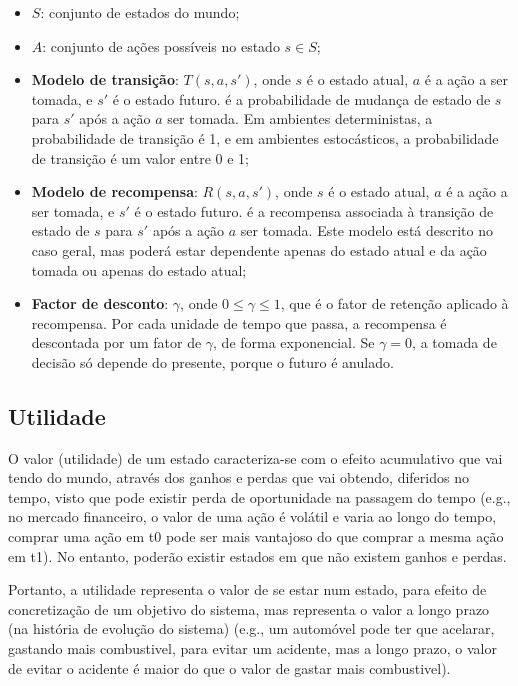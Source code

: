 \begin{itemize}\label{itemize:processo-decisao-markov}
    \item \textbf{$S$}: conjunto de estados do mundo;
    \item \textbf{$A$}: conjunto de ações possíveis no estado $s \in S$;
    \item \textbf{Modelo de transição}: \( T(s, a, s') \), onde \( s \) é o estado atual, \( a \) é a ação a ser tomada, e \( s' \) é o estado futuro.
    é a probabilidade de mudança de estado de \( s \) para \( s' \) após a ação \( a \) ser tomada.
    Em ambientes deterministas, a probabilidade de transição é 1, e em ambientes estocásticos, a probabilidade de transição é um valor entre 0 e 1;
    \item \textbf{Modelo de recompensa}: \( R(s, a, s') \), onde \( s \) é o estado atual, \( a \) é a ação a ser tomada, e \( s' \) é o estado futuro.
    é a recompensa associada à transição de estado de \( s \) para \( s' \) após a ação \( a \) ser tomada.
    Este modelo está descrito no caso geral, mas poderá estar dependente apenas do estado atual e da ação tomada ou apenas do estado atual;
    \item \textbf{Factor de desconto}: \( \gamma \), onde \( 0 \leq \gamma \leq 1 \), que é o fator de retenção aplicado à recompensa.
    Por cada unidade de tempo que passa, a recompensa é descontada por um fator de \( \gamma \), de forma exponencial.
    Se \( \gamma = 0 \), a tomada de decisão só depende do presente, porque o futuro é anulado.
\end{itemize}

\subsection{Utilidade}\label{subsec:utilidade}

O valor (utilidade) de um estado caracteriza-se com o efeito acumulativo que vai tendo do mundo, através dos ganhos e perdas que vai obtendo, diferidos no tempo, visto que pode existir perda de oportunidade na passagem do tempo (e.g., no mercado financeiro, o valor de uma ação é volátil e varia ao longo do tempo, comprar uma ação em t0 pode ser mais vantajoso do que comprar a mesma ação em t1).
No entanto, poderão existir estados em que não existem ganhos e perdas.

Portanto, a utilidade representa o valor de se estar num estado, para efeito de concretização de um objetivo do sistema, mas representa o valor a longo prazo (na história de evolução do sistema) (e.g., um automóvel pode ter que acelarar, gastando mais combustivel, para evitar um acidente, mas a longo prazo, o valor de evitar o acidente é maior do que o valor de gastar mais combustivel).

